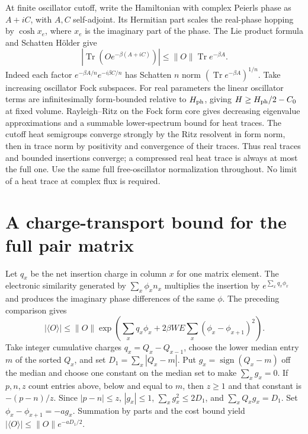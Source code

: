 \documentclass[11pt]{article}
\begin{document}
At finite oscillator cutoff, write the Hamiltonian with complex Peierls phase as $A+iC$, with $A,C$ self-adjoint. Its Hermitian part scales the real-phase hopping by $\cosh x_e$, where $x_e$ is the imaginary part of the phase. The Lie product formula and Schatten H\"older give
\[
 |\operatorname{Tr}(Oe^{-\beta(A+iC)})|\le\|O\|\operatorname{Tr}e^{-\beta A}.
\]
Indeed each factor $e^{-\beta A/n}e^{-i\beta C/n}$ has Schatten $n$ norm $(\operatorname{Tr}e^{-\beta A})^{1/n}$. Take increasing oscillator Fock subspaces. For real parameters the linear oscillator terms are infinitesimally form-bounded relative to $H_{\rm ph}$, giving $H\ge H_{\rm ph}/2-C_0$ at fixed volume. Rayleigh--Ritz on the Fock form core gives decreasing eigenvalue approximations and a summable lower-spectrum bound for heat traces. The cutoff heat semigroups converge strongly by the Ritz resolvent in form norm, then in trace norm by positivity and convergence of their traces. Thus real traces and bounded insertions converge; a compressed real heat trace is always at most the full one. Use the same full free-oscillator normalization throughout. No limit of a heat trace at complex flux is required.

\section{A charge-transport bound for the full pair matrix}
Let $q_x$ be the net insertion charge in column $x$ for one matrix element. The electronic similarity generated by $\sum_x\phi_x n_x$ multiplies the insertion by $e^{\sum_x q_x\phi_x}$ and produces the imaginary phase differences of the same $\phi$. The preceding comparison gives
\begin{equation}\label{eq:insertion}
 |\langle O\rangle|\le \|O\|\exp\left(\sum_x q_x\phi_x+2\beta WE\sum_x(\phi_x-\phi_{x+1})^2\right).
\end{equation}
Take integer cumulative charges $q_x=Q_x-Q_{x-1}$, choose the lower median entry $m$ of the sorted $Q_x$, and set $D_1=\sum_x|Q_x-m|$. Put $g_x=\operatorname{sign}(Q_x-m)$ off the median and choose one constant on the median set to make $\sum_x g_x=0$. If $p,n,z$ count entries above, below and equal to $m$, then $z\ge1$ and that constant is $-(p-n)/z$. Since $|p-n|\le z$, $|g_x|\le1$, $\sum_x g_x^2\le2D_1$, and $\sum_x Q_xg_x=D_1$. Set $\phi_x-\phi_{x+1}=-a g_x$. Summation by parts and the cost bound yield $|\langle O\rangle|\le\|O\|e^{-aD_1/2}$.
\end{document}
